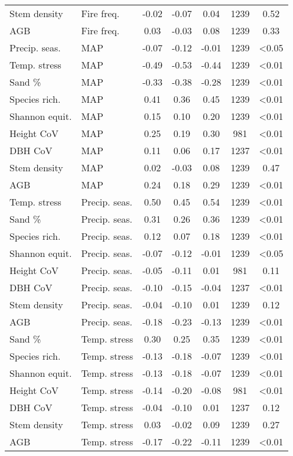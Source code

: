 \begin{longtable}{llS[table-format=-1.2]S[table-format=-1.2]S[table-format=-1.2]S[table-format=4.0]S[table-format=<1.2]}
Stem density & Fire freq. & -0.02 & -0.07 & 0.04 & 1239 & 0.52 \\ 
AGB & Fire freq. & 0.03 & -0.03 & 0.08 & 1239 & 0.33 \\ 
Precip. seas. & MAP & -0.07 & -0.12 & -0.01 & 1239 & <0.05 \\ 
Temp. stress & MAP & -0.49 & -0.53 & -0.44 & 1239 & <0.01 \\ 
Sand \% & MAP & -0.33 & -0.38 & -0.28 & 1239 & <0.01 \\ 
Species rich. & MAP & 0.41 & 0.36 & 0.45 & 1239 & <0.01 \\ 
Shannon equit. & MAP & 0.15 & 0.10 & 0.20 & 1239 & <0.01 \\ 
Height CoV & MAP & 0.25 & 0.19 & 0.30 & 981 & <0.01 \\ 
DBH CoV & MAP & 0.11 & 0.06 & 0.17 & 1237 & <0.01 \\ 
Stem density & MAP & 0.02 & -0.03 & 0.08 & 1239 & 0.47 \\ 
AGB & MAP & 0.24 & 0.18 & 0.29 & 1239 & <0.01 \\ 
Temp. stress & Precip. seas. & 0.50 & 0.45 & 0.54 & 1239 & <0.01 \\ 
Sand \% & Precip. seas. & 0.31 & 0.26 & 0.36 & 1239 & <0.01 \\ 
Species rich. & Precip. seas. & 0.12 & 0.07 & 0.18 & 1239 & <0.01 \\ 
Shannon equit. & Precip. seas. & -0.07 & -0.12 & -0.01 & 1239 & <0.05 \\ 
Height CoV & Precip. seas. & -0.05 & -0.11 & 0.01 & 981 & 0.11 \\ 
DBH CoV & Precip. seas. & -0.10 & -0.15 & -0.04 & 1237 & <0.01 \\ 
Stem density & Precip. seas. & -0.04 & -0.10 & 0.01 & 1239 & 0.12 \\ 
AGB & Precip. seas. & -0.18 & -0.23 & -0.13 & 1239 & <0.01 \\ 
Sand \% & Temp. stress & 0.30 & 0.25 & 0.35 & 1239 & <0.01 \\ 
Species rich. & Temp. stress & -0.13 & -0.18 & -0.07 & 1239 & <0.01 \\ 
Shannon equit. & Temp. stress & -0.13 & -0.18 & -0.07 & 1239 & <0.01 \\ 
Height CoV & Temp. stress & -0.14 & -0.20 & -0.08 & 981 & <0.01 \\ 
DBH CoV & Temp. stress & -0.04 & -0.10 & 0.01 & 1237 & 0.12 \\ 
Stem density & Temp. stress & 0.03 & -0.02 & 0.09 & 1239 & 0.27 \\ 
AGB & Temp. stress & -0.17 & -0.22 & -0.11 & 1239 & <0.01 \\ 

\end{longtable}
